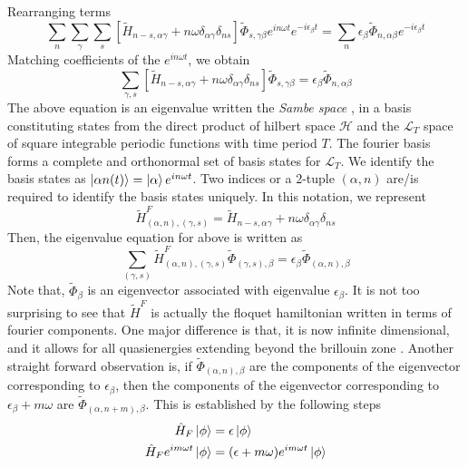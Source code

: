 Rearranging terms
\begin{equation*}
\sum_{n}\sum_{\gamma}\sum_{s}{[\tilde{H}_{n-s,\alpha\gamma} + n\omega\delta_{\alpha\gamma}\delta_{ns}]\tilde{\Phi}_{s,\gamma\beta}e^{in\omega t}e^{-i\epsilon_\beta t}}
 = \sum_{n}{\epsilon_\beta \tilde{\Phi}_{n,\alpha\beta}e^{-i\epsilon_\beta t}}
\end{equation*}
Matching coefficients of the $e^{in\omega t}$, we obtain
\begin{equation}
 \sum_{\gamma, s}{[\tilde{H}_{n-s,\alpha\gamma} + n\omega\delta_{\alpha\gamma}\delta_{ns}]\tilde{\Phi}_{s,\gamma\beta}} = \epsilon_\beta \tilde{\Phi}_{n,\alpha\beta}
\end{equation}
The above equation is an eigenvalue written the \emph{Sambe space} \cite{sambe1973steady, anisimovas2015high, shirley1965solution}, in a basis constituting states from the direct product of hilbert space $\mathcal{H}$ and 
the $\mathcal{L}_{T}$ space of square integrable periodic functions with time period $T$. 
The fourier basis forms a complete and orthonormal set of basis states for $\mathcal{L}_{T}$. We identify the basis states as $\ket{\alpha n(t)} = \ket{\alpha}e^{in\omega t}$.
Two indices or a 2-tuple $(\alpha, n)$ are/is required to identify the basis states uniquely. In this notation, we represent
\begin{equation}
 \tilde{H}^{F}_{(\alpha,n), (\gamma, s)} = \tilde{H}_{n-s,\alpha\gamma} + n\omega\delta_{\alpha\gamma}\delta_{ns}
\end{equation}
Then, the eigenvalue equation for above is written as
\begin{equation}
 \sum_{(\gamma, s)}{\tilde{H}^{F}_{(\alpha,n), (\gamma, s)}\tilde{\Phi}_{(\gamma,s), \beta}} = \epsilon_\beta\tilde{\Phi}_{(\alpha,n), \beta}
\end{equation} Note that, $\tilde{\Phi}_{\beta}$ is an eigenvector associated with eigenvalue $\epsilon_\beta$.
It is not too surprising to see that $\tilde{H}^{F}$ is actually the floquet hamiltonian written in terms of fourier components. One major difference is that, it is
now infinite dimensional, and it allows for all quasienergies extending beyond the brillouin zone \cite{shirley1965solution, anisimovas2015high}. Another straight forward
observation is, if $\tilde{\Phi}_{(\alpha,n), \beta}$ are the components of the eigenvector corresponding to $\epsilon_\beta$, then the components of the eigenvector corresponding
to $\epsilon_\beta + m\omega$ are $\tilde{\Phi}_{(\alpha,n+m), \beta}$. This is established by the following steps
\begin{align*}
 \hat{H}_{F}\ket{\phi} &= \epsilon\ket{\phi} \\
 \hat{H}_{F}e^{im\omega t}\ket{\phi} &= (\epsilon+m\omega)e^{im\omega t}\ket{\phi}
\end{align*} 

